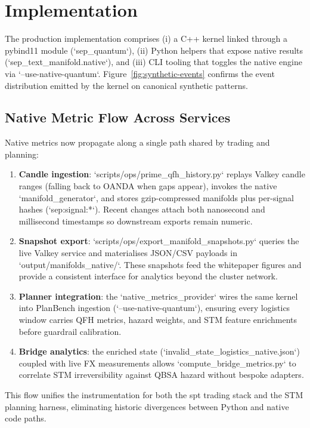 \documentclass[11pt]{article}
\begin{document}
\section{Implementation}
The production implementation comprises (i) a C++ kernel linked through a pybind11 module (`sep\_quantum`), (ii) Python helpers that expose native results (`sep\_text\_manifold.native`), and (iii) CLI tooling that toggles the native engine via `--use-native-quantum`. Figure~\ref{fig:synthetic-events} confirms the event distribution emitted by the kernel on canonical synthetic patterns.

\subsection{Native Metric Flow Across Services}
Native metrics now propagate along a single path shared by trading and planning:
\begin{enumerate}
  \item \textbf{Candle ingestion}: `scripts/ops/prime\_qfh\_history.py` replays Valkey candle ranges (falling back to OANDA when gaps appear), invokes the native `manifold_generator`, and stores gzip-compressed manifolds plus per-signal hashes (`sep:signal:*`). Recent changes attach both nanosecond and millisecond timestamps so downstream exports remain numeric.
  \item \textbf{Snapshot export}: `scripts/ops/export\_manifold\_snapshots.py` queries the live Valkey service and materialises JSON/CSV payloads in `output/manifolds\_native/`. These snapshots feed the whitepaper figures and provide a consistent interface for analytics beyond the cluster network.
  \item \textbf{Planner integration}: the `native_metrics_provider` wires the same kernel into PlanBench ingestion (`--use-native-quantum`), ensuring every logistics window carries QFH metrics, hazard weights, and STM feature enrichments before guardrail calibration.
  \item \textbf{Bridge analytics}: the enriched state (`invalid\_state\_logistics\_native.json`) coupled with live FX measurements allows `compute_bridge_metrics.py` to correlate STM irreversibility against QBSA hazard without bespoke adapters.
\end{enumerate}

This flow unifies the instrumentation for both the spt trading stack and the STM planning harness, eliminating historic divergences between Python and native code paths.
\end{document}

